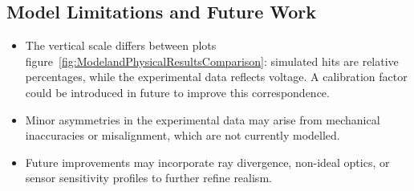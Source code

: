 \subsection{Model Limitations and Future Work}
\begin{itemize}
    \item The vertical scale differs between plots figure~\ref{fig:ModelandPhysicalResultsComparison}: simulated hits are relative percentages, while the experimental data reflects voltage. A calibration factor could be introduced in future to improve this correspondence.
    \item Minor asymmetries in the experimental data may arise from mechanical inaccuracies or misalignment, which are not currently modelled.
    \item Future improvements may incorporate ray divergence, non-ideal optics, or sensor sensitivity profiles to further refine realism.
\end{itemize}





%




%         
